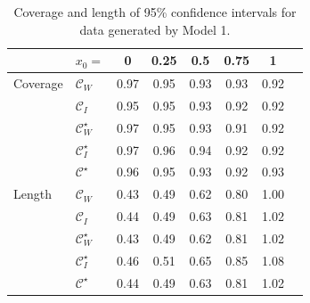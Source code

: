 \documentclass[useAMS,usenatbib,usegraphicx,referee]{biom}\usepackage[]{graphicx}\usepackage[]{color}
\begin{document}
\begin{table}[!htb]
\centering
\caption{Coverage and length of 95\% confidence intervals for data generated by Model 1. \label{tab:results-1}}
\begin{tabular}{llcccccc}
  \toprule
            &  $x_0 =$               & 0    & 0.25 & 0.5  & 0.75 & 1 \\
  \hline
  Coverage  &  $\mathcal{C}_W$       & 0.97 & 0.95 & 0.93 & 0.93 & 0.92 \\
            &  $\mathcal{C}_I$       & 0.95 & 0.95 & 0.93 & 0.92 & 0.92 \\
            &  $\mathcal{C}^\star_W$ & 0.97 & 0.95 & 0.93 & 0.91 & 0.92 \\
            &  $\mathcal{C}^\star_I$ & 0.97 & 0.96 & 0.94 & 0.92 & 0.92 \\
            &  $\mathcal{C}^\star$   & 0.96 & 0.95 & 0.93 & 0.92 & 0.93 \\
  \hline
  Length    &  $\mathcal{C}_W$       & 0.43 & 0.49 & 0.62 & 0.80 & 1.00 \\
            &  $\mathcal{C}_I$       & 0.44 & 0.49 & 0.63 & 0.81 & 1.02 \\
            &  $\mathcal{C}^\star_W$ & 0.43 & 0.49 & 0.62 & 0.81 & 1.02 \\
            &  $\mathcal{C}^\star_I$ & 0.46 & 0.51 & 0.65 & 0.85 & 1.08 \\
            &  $\mathcal{C}^\star$   & 0.44 & 0.49 & 0.63 & 0.81 & 1.02 \\
  \bottomrule
\end{tabular}\vskip18pt
\end{table}
\end{document}
